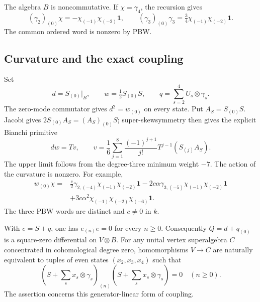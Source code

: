 The algebra $B$ is noncommutative.  If $\chi=\gamma_4$, the recursion
gives
\[
 (\gamma_2)_{(0)}\chi=-\chi_{(-1)}\chi_{(-2)}\mathbf1,
 \qquad
 (\gamma_3)_{(0)}\gamma_3=\tfrac34\chi_{(-1)}\chi_{(-2)}\mathbf1.
\]
The common ordered word is nonzero by PBW.

\subsection{Curvature and the exact coupling}

Set
\[
 d=S_{(0)}|_B,\qquad w=\tfrac12S_{(0)}S,
 \qquad q=\sum_{s=2}^4U_s\otimes\gamma_s.
\]
The zero-mode commutator gives $d^2=w_{(0)}$ on every state.  Put
$A_S=S_{(0)}S$.  Jacobi gives $2S_{(0)}A_S=(A_S)_{(0)}S$;
super-skewsymmetry then gives the explicit Bianchi primitive
\begin{equation}\label{cyquant:eq:wfour-bianchi}
 dw=Tv,\qquad
 v=\frac16\sum_{j=1}^{8}\frac{(-1)^{j+1}}{j!}
              T^{j-1}(S_{(j)}A_S).
\end{equation}
The upper limit follows from the degree-three minimum weight $-7$.
The action of the curvature is nonzero.  For example,
\begin{equation}\label{cyquant:eq:wfour-curvature}
 \begin{aligned}
 w_{(0)}\chi={}&\frac c2\gamma_{2,(-4)}\chi_{(-1)}\chi_{(-2)}\mathbf1
 -2c\alpha\gamma_{3,(-5)}\chi_{(-1)}\chi_{(-2)}\mathbf1\\
 &+3c\alpha^2\chi_{(-1)}\chi_{(-2)}\chi_{(-6)}\mathbf1.
 \end{aligned}
\end{equation}
The three PBW words are distinct and $c\ne0$ in $k$.

\begin{theorem}\label{cyquant:thm:wfour-coupling}
With $e=S+q$, one has $e_{(n)}e=0$ for every $n\geq0$.
Consequently $Q=d+q_{(0)}$ is a square-zero differential on $V\otimes B$.
For any unital vertex superalgebra $C$ concentrated in cohomological
degree zero, homomorphisms $V\to C$ are naturally equivalent to tuples
of even states $(x_2,x_3,x_4)$ such that
\[
 (S+\textstyle\sum_sx_s\otimes\gamma_s)_{(n)}
 (S+\textstyle\sum_sx_s\otimes\gamma_s)=0\quad(n\geq0).
\]
The assertion concerns this generator-linear form of coupling.
\end{theorem}

